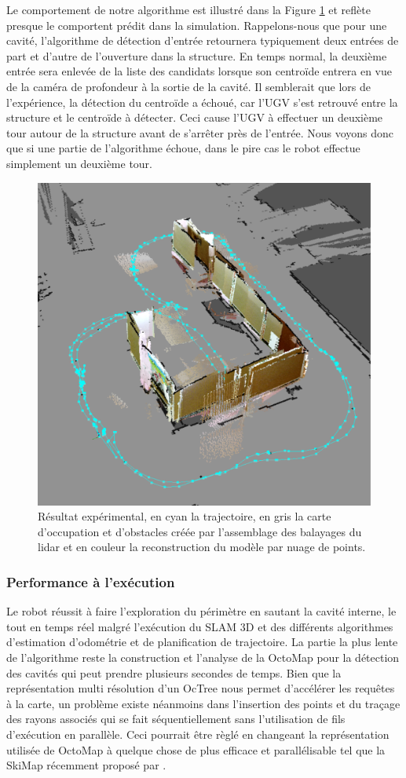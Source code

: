 Le comportement de notre algorithme est illustré dans la Figure \ref{fig:exp_angled_view} et reflète presque le comportent prédit dans la simulation. Rappelons-nous que pour une cavité, l'algorithme de détection d'entrée retournera typiquement deux entrées de part et d'autre de l'ouverture dans la structure. En temps normal, la deuxième entrée sera enlevée de la liste des candidats lorsque son centroïde entrera en vue de la caméra de profondeur à la sortie de la cavité. Il semblerait que lors de l'expérience, la détection du centroïde a échoué, car l'UGV s'est retrouvé entre la structure et le centroïde à détecter. Ceci cause l'UGV à effectuer un deuxième tour autour de la structure avant de s'arrêter près de l'entrée. Nous voyons donc que si une partie de l'algorithme échoue, dans le pire cas le robot effectue simplement un deuxième tour.

\begin{figure}[!ht]
  \centering
  \includegraphics[width=0.5\linewidth]{images/exp_angled_view}
  \caption{Résultat expérimental, en cyan la trajectoire, en gris la carte d'occupation et d'obstacles créée par l'assemblage des balayages du lidar et en couleur la reconstruction du modèle par nuage de points.}
  \label{fig:exp_angled_view}
\end{figure}

\subsubsection{Performance à l'exécution}

Le robot réussit à faire l'exploration du périmètre en sautant la cavité interne, le tout en temps réel malgré l'exécution du SLAM 3D et des différents algorithmes d'estimation d'odométrie et de planification de trajectoire. La partie la plus lente de l'algorithme reste la construction et l'analyse de la OctoMap pour la détection des cavités qui peut prendre plusieurs secondes de temps. Bien que la représentation multi résolution d'un OcTree nous permet d'accélérer les requêtes à la carte, un problème existe néanmoins dans l'insertion des points et du traçage des rayons associés qui se fait séquentiellement sans l'utilisation de fils d'exécution en parallèle. Ceci pourrait être règlé en changeant la représentation utilisée de OctoMap à quelque chose de plus efficace et parallélisable tel que la SkiMap récemment proposé par \citep{Gregorio2017}.

